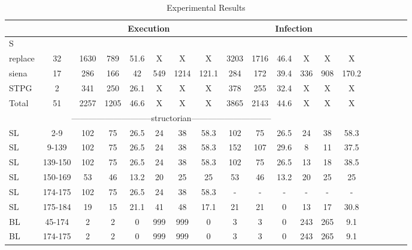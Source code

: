 \begin{table*}
\begin{CodeOut}
\begin{center}
\caption {\label{table:all_results}\scriptsize{Experimental Results}}
\begin {tabular} {|l|c|c|c|c|c|c|c|c|c|c|c|c|c|c|c|c|c|c|}
\hline
&&\multicolumn{6}{|c|}{Execution}&\multicolumn{6}{|c|}{Infection}\\ 
\hline
S &\CenterCell{V} &\CenterCell{$E_{\CodeIn{Pex}}$}&\CenterCell{$E_{\CodeIn{eXpress}}$}&\CenterCell{$E_{Red}(\%)$ }&\CenterCell{$Ne_{\CodeIn{Pex}}$}&\CenterCell{$Ne_{\CodeIn{eXpress}}$}&\CenterCell{$Ne_{Inc}(\%)$}&\CenterCell{$I_{\CodeIn{Pex}}$}&\CenterCell{$I_{\CodeIn{eXpress}}$}&\CenterCell{$I_{Red}(\%)$}&\CenterCell{$Ni_{\CodeIn{Pex}}$}&\CenterCell{$Ni_{\CodeIn{eXpress}}$}&\CenterCell{$Ni_{Inc}(\%)$}\\

\hline
replace&32&1630&789&51.6&X&X&X&3203&1716&46.4&X&X&X\\
\hline
siena&17&286&166&42&549&1214&121.1&284&172&39.4&336&908&170.2\\
\hline
STPG&2&341&250&26.1&X&X&X&378&255&32.4&X&X&X\\
\hline
Total&51&2257&1205&46.6&X&X&X&3865&2143&44.6&X&X&X\\
\hline
\multicolumn{13}{|c|}{-----------------------------structorian-----------------------------}&\\
\hline
SL&2-9&102&75&26.5&24&38&58.3&102&75&26.5&24&38&58.3\\
\hline
SL&9-139&102&75&26.5&24&38&58.3&152&107&29.6&8&11&37.5\\
\hline
SL&139-150&102&75&26.5&24&38&58.3&102&75&26.5&13&18&38.5\\
\hline
SL&150-169&53&46&13.2&20&25&25&53&46&13.2&20&25&25\\
\hline
SL&174-175&102&75&26.5&24&38&58.3&-&-&-&-&-&-\\
\hline
SL&175-184&19&15&21.1&41&48&17.1&21&21&0&13&17&30.8\\
\hline
BL&45-174&2&2&0&999&999&0&3&3&0&243&265&9.1\\
\hline
BL&174-175&2&2&0&999&999&0&3&3&0&243&265&9.1\\
\hline


\end{tabular}
\end{center}
\end{CodeOut}
\end{table*}
